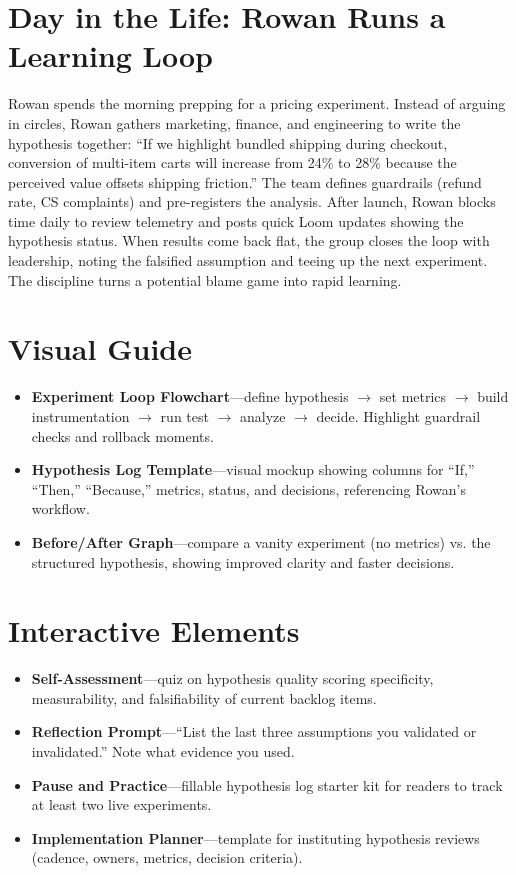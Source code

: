 \section{Day in the Life: Rowan Runs a Learning Loop}
Rowan spends the morning prepping for a pricing experiment. Instead of arguing in circles, Rowan gathers marketing, finance, and engineering to write the hypothesis together: ``If we highlight bundled shipping during checkout, conversion of multi-item carts will increase from 24\% to 28\% because the perceived value offsets shipping friction.'' The team defines guardrails (refund rate, CS complaints) and pre-registers the analysis. After launch, Rowan blocks time daily to review telemetry and posts quick Loom updates showing the hypothesis status. When results come back flat, the group closes the loop with leadership, noting the falsified assumption and teeing up the next experiment. The discipline turns a potential blame game into rapid learning.

\section{Visual Guide}
\label{sec:hypothesis-visuals}
\begin{itemize}
    \item \textbf{Experiment Loop Flowchart}—define hypothesis $\rightarrow$ set metrics $\rightarrow$ build instrumentation $\rightarrow$ run test $\rightarrow$ analyze $\rightarrow$ decide. Highlight guardrail checks and rollback moments.
    \item \textbf{Hypothesis Log Template}—visual mockup showing columns for ``If,'' ``Then,'' ``Because,'' metrics, status, and decisions, referencing Rowan’s workflow.
    \item \textbf{Before/After Graph}—compare a vanity experiment (no metrics) vs. the structured hypothesis, showing improved clarity and faster decisions.
\end{itemize}

\section{Interactive Elements}
\label{sec:hypothesis-interactive}
\begin{itemize}
    \item \textbf{Self-Assessment}—quiz on hypothesis quality scoring specificity, measurability, and falsifiability of current backlog items.
    \item \textbf{Reflection Prompt}—``List the last three assumptions you validated or invalidated.'' Note what evidence you used.
    \item \textbf{Pause and Practice}—fillable hypothesis log starter kit for readers to track at least two live experiments.
    \item \textbf{Implementation Planner}—template for instituting hypothesis reviews (cadence, owners, metrics, decision criteria).
\end{itemize}

